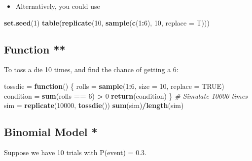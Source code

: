 \documentclass[]{article}
\newenvironment{Shaded}{\begin{snugshade}}{\end{snugshade}}
\newcommand{\CommentTok}[1]{\textcolor[rgb]{0.56,0.35,0.01}{\textit{#1}}}
\newcommand{\ControlFlowTok}[1]{\textcolor[rgb]{0.13,0.29,0.53}{\textbf{#1}}}
\newcommand{\DataTypeTok}[1]{\textcolor[rgb]{0.13,0.29,0.53}{#1}}
\newcommand{\DecValTok}[1]{\textcolor[rgb]{0.00,0.00,0.81}{#1}}
\newcommand{\KeywordTok}[1]{\textcolor[rgb]{0.13,0.29,0.53}{\textbf{#1}}}
\newcommand{\NormalTok}[1]{#1}
\newcommand{\OperatorTok}[1]{\textcolor[rgb]{0.81,0.36,0.00}{\textbf{#1}}}
\newcommand{\OtherTok}[1]{\textcolor[rgb]{0.56,0.35,0.01}{#1}}
\newcommand{\StringTok}[1]{\textcolor[rgb]{0.31,0.60,0.02}{#1}}
\providecommand{\tightlist}{%
  \setlength{\itemsep}{0pt}\setlength{\parskip}{0pt}}
\begin{document}
\begin{itemize}
\tightlist
\item
  Alternatively, you could use
\end{itemize}

\begin{Shaded}
\begin{Highlighting}[]
\KeywordTok{set.seed}\NormalTok{(}\DecValTok{1}\NormalTok{)}
\KeywordTok{table}\NormalTok{(}\KeywordTok{replicate}\NormalTok{(}\DecValTok{10}\NormalTok{, }\KeywordTok{sample}\NormalTok{(}\KeywordTok{c}\NormalTok{(}\DecValTok{1}\OperatorTok{:}\DecValTok{6}\NormalTok{), }\DecValTok{10}\NormalTok{, }\DataTypeTok{replace =}\NormalTok{ T)))}
\end{Highlighting}
\end{Shaded}

\hypertarget{function}{%
\subsection{Function **}\label{function}}

To toss a die 10 times, and find the chance of getting a 6:

\begin{Shaded}
\begin{Highlighting}[]
\NormalTok{tossdie =}\StringTok{ }\ControlFlowTok{function}\NormalTok{() \{}
\NormalTok{    rolls =}\StringTok{ }\KeywordTok{sample}\NormalTok{(}\DecValTok{1}\OperatorTok{:}\DecValTok{6}\NormalTok{, }\DataTypeTok{size =} \DecValTok{10}\NormalTok{, }\DataTypeTok{replace =} \OtherTok{TRUE}\NormalTok{)}
\NormalTok{    condition =}\StringTok{ }\KeywordTok{sum}\NormalTok{(rolls }\OperatorTok{==}\StringTok{ }\DecValTok{6}\NormalTok{) }\OperatorTok{>}\StringTok{ }\DecValTok{0}
    \KeywordTok{return}\NormalTok{(condition)}
\NormalTok{\}}
\CommentTok{# Simulate 10000 times}
\NormalTok{sim =}\StringTok{ }\KeywordTok{replicate}\NormalTok{(}\DecValTok{10000}\NormalTok{, }\KeywordTok{tossdie}\NormalTok{())}
\KeywordTok{sum}\NormalTok{(sim)}\OperatorTok{/}\KeywordTok{length}\NormalTok{(sim)}
\end{Highlighting}
\end{Shaded}

\hypertarget{binomial-model}{%
\subsection{Binomial Model *}\label{binomial-model}}

Suppose we have 10 trials with P(event) = 0.3.
\end{document}
